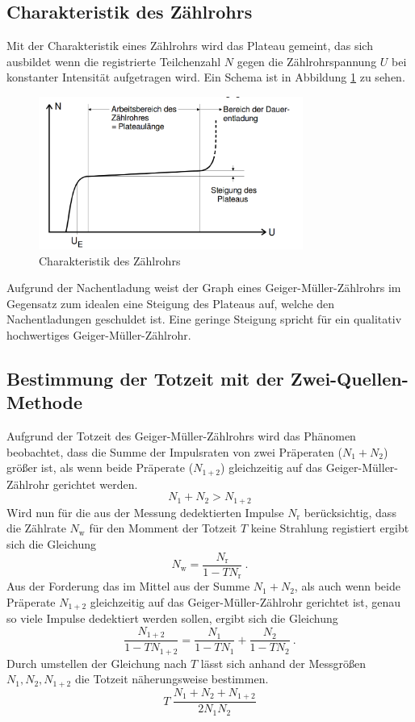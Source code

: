 \subsection{Charakteristik des Zählrohrs}
Mit der Charakteristik eines Zählrohrs wird das Plateau gemeint, das sich ausbildet wenn die registrierte Teilchenzahl $N$ gegen die Zählrohrspannung $U$ bei konstanter Intensität aufgetragen wird. Ein Schema ist in Abbildung \ref{fig:Pla} zu sehen.
\begin{figure}
  \centering
  \includegraphics[height=5cm]{picture/Plateau.pdf}
  \caption{Charakteristik des Zählrohrs \cite{sample}}
  \label{fig:Pla}
\end{figure}
Aufgrund der Nachentladung weist der Graph eines Geiger-Müller-Zählrohrs im Gegensatz zum idealen eine Steigung des Plateaus auf, welche den Nachentladungen geschuldet ist. Eine geringe Steigung spricht für ein qualitativ hochwertiges Geiger-Müller-Zählrohr.


\subsection{Bestimmung der Totzeit mit der Zwei-Quellen-Methode}
Aufgrund der Totzeit des Geiger-Müller-Zählrohrs wird das Phänomen beobachtet, dass die Summe der Impulsraten von zwei Präperaten ($N_1 + N_2$) größer ist, als wenn beide Präperate ($N_{1+2}$) gleichzeitig auf das Geiger-Müller-Zählrohr gerichtet werden.
\begin{equation}
  	N_1 + N_2 > N_{1+2}
  \label{eqn:ungl}
\end{equation}
Wird nun für die aus der Messung dedektierten Impulse $N_\text{r}$ berücksichtig, dass die Zählrate $N_\text{w}$ für den Momment der Totzeit $T$ keine Strahlung registiert ergibt sich die Gleichung
\begin{equation}
  N_\text{w} = \frac{N_\text{r}}{1 - T N_\text{r} } \ .
  \label{eqn:zaelr}
\end{equation}
Aus der Forderung das im Mittel aus der Summe $N_1 + N_2$, als auch wenn beide Präperate $N_{1+2}$ gleichzeitig auf das Geiger-Müller-Zählrohr gerichtet ist, genau so viele Impulse dedektiert werden sollen, ergibt sich die Gleichung
\begin{equation}
  \frac{N_{1+2}}{1-TN_{1+2}} = \frac{N_{1}}{1-TN_{1}} + \frac{N_{2}}{1-TN_{2}} \ .
\end{equation}
Durch umstellen der Gleichung nach $T$ lässt sich anhand der Messgrößen $N_1, N_2, N_{1+2}$  die Totzeit näherungsweise bestimmen.
\begin{equation}
  T ~ \frac{N_1 + N_2 + N_{1+2}}{2 N_1 N_2}
  \label{eqn:T}
\end{equation}


